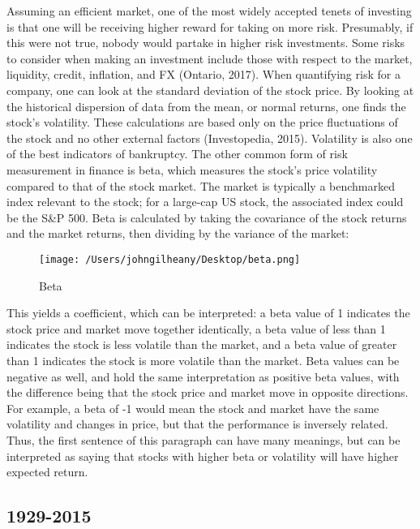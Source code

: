 \documentclass[12pt,twoside]{reedthesis}
\theoremstyle{definition}
\theoremstyle{definition}
\theoremstyle{definition}
\theoremstyle{remark}
\begin{document}
Assuming an efficient market, one of the most widely accepted tenets of
investing is that one will be receiving higher reward for taking on more
risk. Presumably, if this were not true, nobody would partake in higher
risk investments. Some risks to consider when making an investment
include those with respect to the market, liquidity, credit, inflation,
and FX (Ontario, 2017). When quantifying risk for a company, one can
look at the standard deviation of the stock price. By looking at the
historical dispersion of data from the mean, or normal returns, one
finds the stock's volatility. These calculations are based only on the
price fluctuations of the stock and no other external factors
(Investopedia, 2015). Volatility is also one of the best indicators of
bankruptcy. The other common form of risk measurement in finance is
beta, which measures the stock's price volatility compared to that of
the stock market. The market is typically a benchmarked index relevant
to the stock; for a large-cap US stock, the associated index could be
the S\&P 500. Beta is calculated by taking the covariance of the stock
returns and the market returns, then dividing by the variance of the
market:
\begin{figure}
\centerline{\texttt{[image: /Users/johngilheany/Desktop/beta.png]}}
\caption{Beta}
\label{B}
\end{figure}
This yields a coefficient, which can be interpreted: a beta value of 1
indicates the stock price and market move together identically, a beta
value of less than 1 indicates the stock is less volatile than the
market, and a beta value of greater than 1 indicates the stock is more
volatile than the market. Beta values can be negative as well, and hold
the same interpretation as positive beta values, with the difference
being that the stock price and market move in opposite directions. For
example, a beta of -1 would mean the stock and market have the same
volatility and changes in price, but that the performance is inversely
related. Thus, the first sentence of this paragraph can have many
meanings, but can be interpreted as saying that stocks with higher beta
or volatility will have higher expected return.

\subsection{1929-2015}\label{section}
\end{document}
